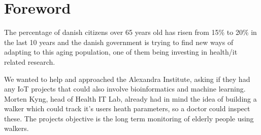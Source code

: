
\chapter*{Foreword}
\label{cha:foreword}

\bigskip
\bigskip
\bigskip
The percentage of danish citizens over 65 years old has risen from 15\% to 20\% in the last 10 years and the danish government is trying to find new ways of adapting to this aging population, one of them being investing in health/it related research.
\bigskip
\bigskip
\bigskip

We wanted to help and approached the Alexandra Institute, asking if they had any IoT projects that could also involve bioinformatics and machine learning. Morten Kyng, head of Health IT Lab, already had in mind the idea of building a walker which could track it’s users heath parameters, so a doctor could inspect these. The projects objective is the long term monitoring of elderly people using walkers. 



